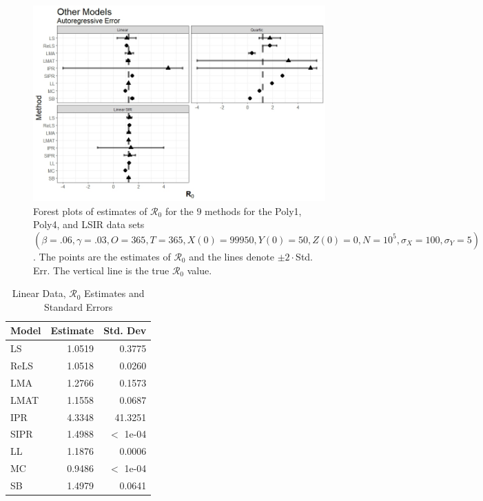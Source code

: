 \documentclass[12pt]{article}
\newcommand{\xxsir}{\ensuremath{9} } %
\newcommand{\rr}{\ensuremath{\mathcal{R}_0}}
\begin{document}
\begin{figure}[H]
	\begin{center}
		\includegraphics[scale=0.5]{images/other_ar.jpeg}
		\caption{Forest plots of estimates of $\rr$ for the \xxsir methods for the Poly1, Poly4, and LSIR data sets $(\beta=.06, \gamma=.03, O=365, T=365, X(0)=99950, Y(0)=50, Z(0)=0, N=10^5, \sigma_X=100, \sigma_Y=5)$.  The points are the estimates of $\rr$ and the lines denote $\pm 2\cdot $Std. Err.  The vertical line is the true $\rr$ value.}
	\end{center}
\end{figure}

\begin{table}[H]
	
	\centering
	\begin{tabular}[t]{l|r|r}
		\hline
		Model & Estimate & Std. Dev\\
		\hline
		LS & 1.0519 & 0.3775\\
		\hline
		ReLS & 1.0518 & 0.0260\\
		\hline
		LMA & 1.2766 & 0.1573\\
		\hline
		LMAT & 1.1558 & 0.0687\\
		\hline
		IPR & 4.3348 & 41.3251\\
		\hline
		SIPR & 1.4988 & $<$ 1e-04\\
		\hline
		LL & 1.1876 & 0.0006\\
		\hline
		MC & 0.9486 & $<$ 1e-04\\
		\hline
		SB & 1.4979 & 0.0641\\
		\hline
	\end{tabular}
	\caption{Linear Data, $\rr$ Estimates and Standard Errors}
\end{table}
\end{document}
